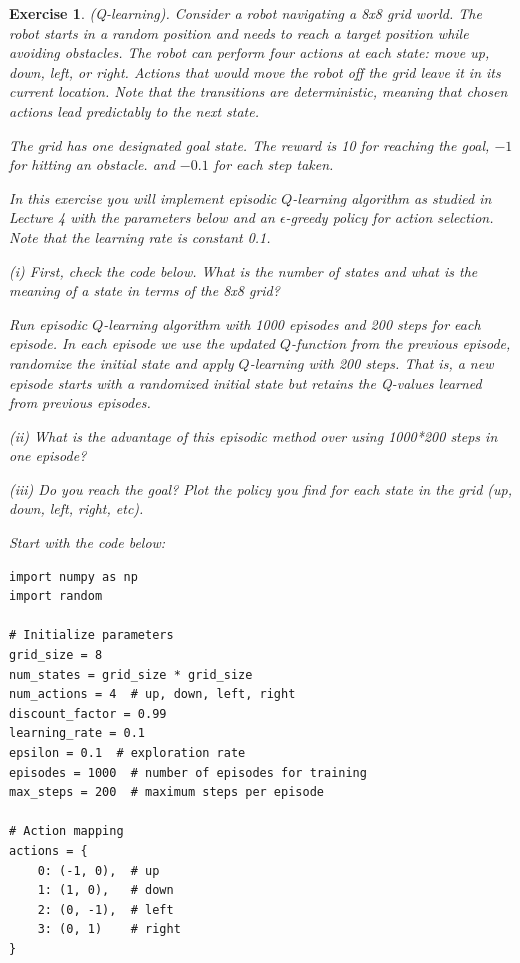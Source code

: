 \documentclass[letter,11pt]{article}
\newtheorem{exercise}{Exercise}[section]
\begin{document}
\begin{exercise} (Q-learning). 
        Consider a robot navigating a 8x8 grid world. The robot starts in a random position and needs to reach a target position while avoiding obstacles. The robot can perform four actions at each state: move up, down, left, or right. Actions that would move the robot off the grid leave it in its current location.
    Note that the transitions are deterministic, meaning that chosen actions lead predictably to the next state.

The grid has one designated goal state. The reward is 10 for reaching the goal, $-1$ for hitting an obstacle.
and $-0.1$ for each step taken. 

 In this exercise you will implement episodic $Q$-learning algorithm as studied in Lecture 4 with the parameters below  and an \(\epsilon\)-greedy policy for action selection. Note that the learning rate is constant 0.1. 

(i) First, check the code below. What is the number of states and what is the meaning of a state in terms of the 8x8 grid?

Run episodic $Q$-learning algorithm with 1000 episodes and 200 steps for each episode. In each episode we use the updated $Q$-function from the previous episode, randomize the initial state and apply $Q$-learning with 200 steps. That is, a new episode starts with a randomized initial state but retains the Q-values learned from previous episodes.

(ii)  What is the advantage of this episodic method over using 1000*200 steps in one episode? 
 

(iii) Do you reach the goal? Plot the policy you find for each state in the grid (up, down, left, right, etc). 

 Start with the code below:

\begin{lstlisting}
import numpy as np
import random

# Initialize parameters
grid_size = 8
num_states = grid_size * grid_size
num_actions = 4  # up, down, left, right
discount_factor = 0.99
learning_rate = 0.1
epsilon = 0.1  # exploration rate
episodes = 1000  # number of episodes for training
max_steps = 200  # maximum steps per episode

# Action mapping
actions = {
    0: (-1, 0),  # up
    1: (1, 0),   # down
    2: (0, -1),  # left
    3: (0, 1)    # right
}


\end{lstlisting}
\end{exercise}
\end{document}
